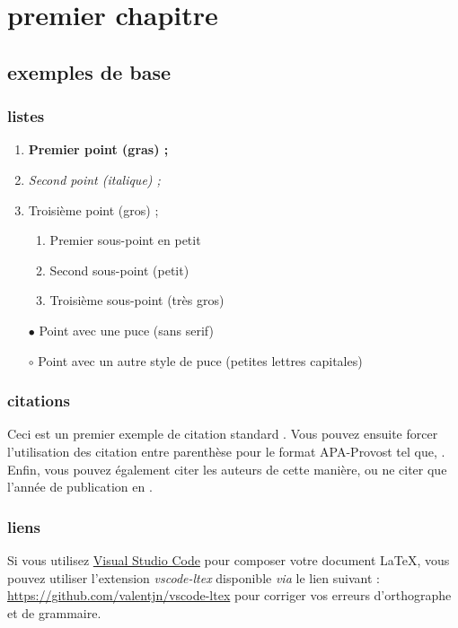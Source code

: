 \chapter{premier chapitre}
\label{chap:chap_1}

\section{exemples de base}
\label{sec:sec_examples_chap_1}

\subsection{listes}
\label{subsec:subsec_list}

\begin{enumerate}
  \item {\bf Premier point (gras) ;}
  \item {\em Second point (italique) ;}
  \item {\Large Troisième point (gros) ;}
      \begin{enumerate}
          \item {\small Premier sous-point en petit}
          \item {\tiny Second sous-point (petit)}
          \item {\Huge Troisième sous-point (très gros)}
      \end{enumerate}
  \item[$\bullet$] {\sf Point avec une puce (sans serif)}
  \item[$\circ$] {\sc Point avec un autre style de puce (petites lettres capitales)}
\end{enumerate}

\subsection{citations}

Ceci est un premier exemple de citation standard \cite{RN3}. Vous pouvez ensuite forcer l'utilisation des citation entre parenthèse pour le format APA-Provost tel que, \citep{RN4}. Enfin, vous pouvez également citer les auteurs \citet{RN5} de cette manière, ou ne citer que l'année de publication en  \citeyear{RN5}.

\subsection{liens}

Si vous utilisez \href{https://code.visualstudio.com/}{Visual Studio Code} pour composer votre document \LaTeX{}, vous pouvez utiliser l'extension \textit{vscode-ltex} disponible \textit{via} le lien suivant : \url{https://github.com/valentjn/vscode-ltex} pour corriger vos erreurs d'orthographe et de grammaire.

